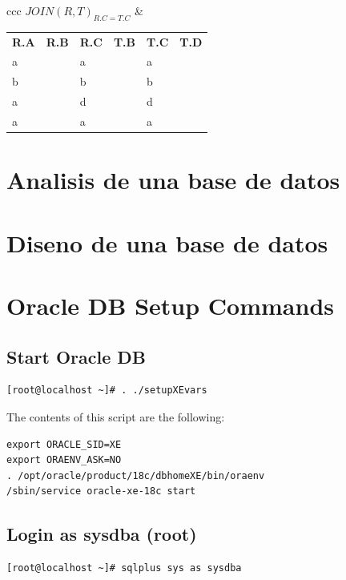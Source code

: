 \documentclass[twoside]{article}
\begin{document}
\begin{center}
\begin{tabular}{ccc}
\tabularnewline
$JOIN(R, T)_{R.C = T.C}$ \Rightarrow
&
\begin{minipage}{.25\linewidth}
\begin{tabular}{| >{\centering}m{1cm}| >{\centering}m{1cm}| >{\centering}m{1cm}| >{\centering}m{1cm}| >{\centering}m{1cm}| >{\centering}m{1cm}|}
\hline
\multicolumn{6}{|c|}{\textbf{Resultado}}
\tabularnewline \hline
\textbf{R.A}
&
\textbf{R.B}
&
\textbf{R.C}
&
\textbf{T.B}
&
\textbf{T.C}
&
\textbf{T.D}
\tabularnewline \hline
a & 1 & a & 1 & a & 1
\tabularnewline \hline
b & 1 & b & 3 & b & 1
\tabularnewline \hline
a & 1 & d & 1 & d & 4
\tabularnewline \hline
a & 1 & a & 2 & a & 3
\tabularnewline \hline
\end{tabular}
\end{minipage}
\end{tabular}
\end{center}

\section{Analisis de una base de datos}
\section{Diseno de una base de datos}


\section{Oracle DB Setup Commands}

\subsection{Start Oracle DB}

\begin{verbatim}
[root@localhost ~]# . ./setupXEvars
\end{verbatim}
The contents of this script are the following:

\begin{verbatim}
export ORACLE_SID=XE
export ORAENV_ASK=NO
. /opt/oracle/product/18c/dbhomeXE/bin/oraenv
/sbin/service oracle-xe-18c start
\end{verbatim}

\subsection{Login as sysdba (root)}
\begin{verbatim}
[root@localhost ~]# sqlplus sys as sysdba
\end{verbatim}
\end{document}
